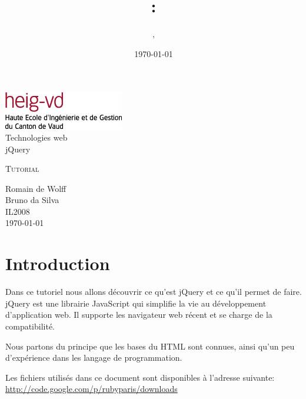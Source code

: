 \documentclass[10pt,a4paper,titlepage]{article}
\author{\auteurOne, \auteurTwo}
\title{\branchetag : \laboname}
\date{\today}
\newcommand{\branche}{Technologies web}
\newcommand{\laboname}{jQuery}
\newcommand{\auteurOne}{Romain de Wolff}
\newcommand{\auteurTwo}{Bruno da Silva}
\newcommand{\promo}{IL2008}
\begin{document}
\pagestyle{headings}
\begin{titlepage}
	\begin{center}
	\includegraphics{img/logo-HEIG-VD.jpg}\\
		\vspace{3cm}
		\LARGE \branche %
		\vspace{3cm}\\
		\Huge \laboname \\
		\vspace{3cm}

		\Large \textsc{Tutorial} \\
		\vspace{3cm}

		\large \auteurOne \\
		\auteurTwo \\	
		\vspace{10pt}
		\normalsize \textsc{\promo} \\

		\vspace{2cm}
		\today
	\end{center}
\end{titlepage}

\tableofcontents

\newpage
\pagestyle{fancy}

\section{Introduction}

Dans ce tutoriel nous allons découvrir ce qu'est jQuery et ce qu'il permet de faire. jQuery est une librairie JavaScript qui simplifie la vie au développement d'application web. Il supporte les navigateur web récent et se charge de la compatibilité.

Nous partons du principe que les bases du HTML sont connues, ainsi qu'un peu d'expérience dans les langage de programmation. 

Les fichiers utilisés dans ce document sont disponibles à l'adresse suivante: \\ \url{http://code.google.com/p/rubyparis/downloads}
\end{document}
